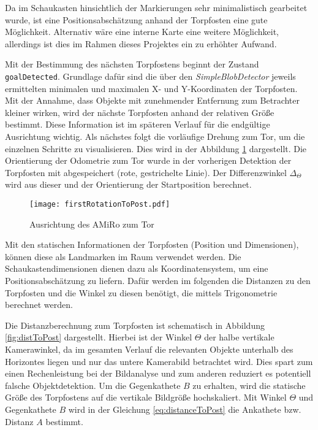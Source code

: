 Da im Schaukasten hinsichtlich der Markierungen sehr minimalistisch gearbeitet wurde, ist eine Positionsabschätzung anhand der Torpfosten eine gute Möglichkeit. Alternativ wäre eine interne Karte eine weitere Möglichkeit, allerdings ist dies im Rahmen dieses Projektes ein zu erhöhter Aufwand.

Mit der Bestimmung des nächsten Torpfostens beginnt der Zustand \texttt{goalDetected}. Grundlage dafür sind die über den \textit{SimpleBlobDetector} jeweils ermittelten minimalen und maximalen X- und Y-Koordinaten der Torpfosten. Mit der Annahme, dass Objekte mit zunehmender Entfernung zum Betrachter kleiner wirken, wird der nächste Torpfosten anhand der relativen Größe bestimmt. Diese Information ist im späteren Verlauf für die endgültige Ausrichtung wichtig. Als nächstes folgt die vorläufige Drehung zum Tor, um die einzelnen Schritte zu visualisieren. Dies wird in der Abbildung \ref{fig:firstRotationToPost} dargestellt. Die Orientierung der Odometrie zum Tor wurde in der vorherigen Detektion der Torpfosten mit abgespeichert (rote, gestrichelte Linie). Der Differenzwinkel $\Delta_\Theta$ wird aus dieser und der Orientierung der Startposition berechnet.

\begin{figure}[h]
	\begin{center}
		\texttt{[image: firstRotationToPost.pdf]} 	
		\caption{Ausrichtung des AMiRo zum Tor}
		\label{fig:firstRotationToPost}
	\end{center}
\end{figure}

Mit den statischen Informationen der Torpfosten (Position und Dimensionen), können diese als Landmarken im Raum verwendet werden. Die Schaukastendimensionen dienen dazu als Koordinatensystem, um eine Positionsabschätzung zu liefern. Dafür werden im folgenden die Distanzen zu den Torpfosten und die Winkel zu diesen benötigt, die mittels Trigonometrie berechnet werden.

Die Distanzberechnung zum Torpfosten ist schematisch in Abbildung \ref{fig:distToPost} dargestellt. Hierbei ist der Winkel $\Theta$ der halbe vertikale Kamerawinkel, da im gesamten Verlauf die relevanten Objekte unterhalb des Horizontes liegen und nur das untere Kamerabild betrachtet wird. Dies spart zum einen Rechenleistung bei der Bildanalyse und zum anderen reduziert es potentiell falsche Objektdetektion. Um die Gegenkathete $B$ zu erhalten, wird die statische Größe des Torpfostens auf die vertikale Bildgröße hochskaliert. Mit Winkel $\Theta$ und Gegenkathete $B$ wird in der Gleichung \ref{eq:distanceToPost} die Ankathete bzw. Distanz $A$ bestimmt.

